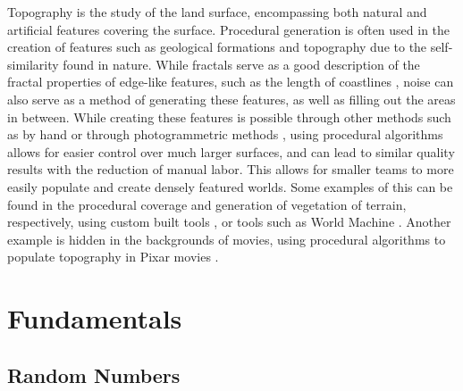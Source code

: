 \documentclass[10pt]{report}
\begin{document}
		Topography is the study of the land surface, encompassing both natural and artificial features covering the surface. Procedural generation is often used in the creation of features such as geological formations and topography due to the self-similarity found in nature. While fractals serve as a good description of the fractal properties of edge-like features, such as the length of coastlines \cite{ijgi5060095}, noise can also serve as a method of generating these features, as well as filling out the areas in between. While creating these features is possible through other methods such as by hand or through photogrammetric methods \cite{bullinger2020photogrammetrybased}, using procedural algorithms allows for easier control over much larger surfaces, and can lead to similar quality results with the reduction of manual labor. This allows for smaller teams to more easily populate and create densely featured worlds. Some examples of this can be found in the procedural coverage and generation of vegetation of terrain, respectively, using custom built tools \cite{redengine}, or tools such as World Machine \cite{world-machine}. Another example is hidden in the backgrounds of movies, using procedural algorithms to populate topography in Pixar movies \cite{10.1145/3388767.3407372}.
		
		\section{Fundamentals} 
			\subsection{Random Numbers} \label{subsec:rng}
		
\end{document}
